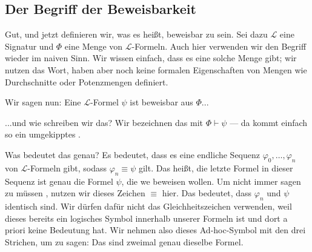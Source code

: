 \begin{math-stroke}
\end{math-stroke}

\subsection{Der Begriff der Beweisbarkeit}

\begin{spoken-clean}[00:17:13 - 00:19:15]
Gut, und jetzt definieren wir, was es heißt, beweisbar zu sein. Sei dazu $\mathcal{L}$ eine Signatur und $\Phi$ eine Menge von $\mathcal{L}$-Formeln. Auch hier verwenden wir den Begriff  wieder im naiven Sinn. Wir wissen einfach, dass es eine solche Menge gibt; wir nutzen das Wort, haben aber noch keine formalen Eigenschaften von Mengen wie Durchschnitte oder Potenzmengen definiert.

Wir sagen nun: Eine $\mathcal{L}$-Formel $\psi$ ist beweisbar aus $\Phi$...
\end{spoken-clean}

\begin{spoken-clean}[00:19:15 - 00:21:34]
...und wie schreiben wir das? Wir bezeichnen das mit $\Phi \vdash \psi$ --- da kommt einfach so ein umgekipptes .

Was bedeutet das genau? Es bedeutet, dass es eine endliche Sequenz $\varphi_0, \dots, \varphi_n$ von $\mathcal{L}$-Formeln gibt, sodass $\varphi_n \equiv \psi$ gilt. Das heißt, die letzte Formel in dieser Sequenz ist genau die Formel $\psi$, die we beweisen wollen. Um nicht immer sagen zu müssen , nutzen wir dieses Zeichen $\equiv$ hier. Das bedeutet, dass $\varphi_n$ und $\psi$ identisch sind. Wir dürfen dafür nicht das Gleichheitszeichen verwenden, weil dieses bereits ein logisches Symbol innerhalb unserer Formeln ist und dort a priori keine Bedeutung hat. Wir nehmen also dieses Ad-hoc-Symbol mit den drei Strichen, um zu sagen: Das sind zweimal genau dieselbe Formel.
\end{spoken-clean}

